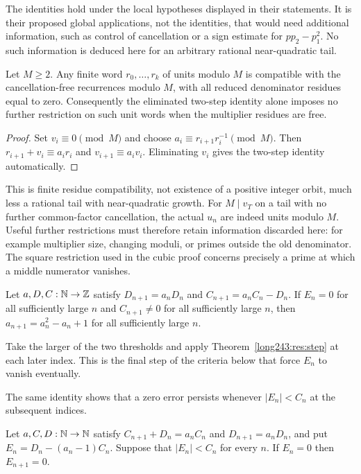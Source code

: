 \documentclass[11pt]{article}
\begin{document}
The identities hold under the local hypotheses displayed in their
statements. It is their proposed global applications, not the identities,
that would need additional information, such as control of cancellation or
a sign estimate for $pp_2-p_1^2$. No such information is deduced here for
an arbitrary rational near-quadratic tail.

\begin{lemma}\label{long243:res:oldmodulussaturation}
Let $M\ge2$. Any finite word $r_0,\ldots,r_k$ of units modulo $M$ is
compatible with the cancellation-free recurrences modulo $M$, with all
reduced denominator residues equal to zero. Consequently the eliminated
two-step identity alone imposes no further restriction on such unit words
when the multiplier residues are free.
\end{lemma}
\begin{proof}
Set $v_i\equiv0\pmod M$ and choose
$a_i\equiv r_{i+1}r_i^{-1}\pmod M$. Then
$r_{i+1}+v_i\equiv a_ir_i$ and $v_{i+1}\equiv a_iv_i$.
Eliminating $v_i$ gives the two-step identity automatically.
\end{proof}
This is finite residue compatibility, not existence of a positive integer
orbit, much less a rational tail with near-quadratic growth.
For $M\mid v_T$ on a tail with no further common-factor cancellation,
the actual $u_n$ are indeed units modulo
$M$. Useful further restrictions must therefore retain information discarded
here: for example multiplier size, changing moduli, or primes outside the
old denominator. The square restriction used in the cubic proof concerns
precisely a prime at which a middle numerator vanishes.

\begin{theorem}\label{long243:res:eventual}
Let $a,D,C:\mathbb{N}\to\mathbb{Z}$ satisfy $D_{n+1}=a_nD_n$ and
$C_{n+1}=a_nC_n-D_n$.  If $E_n=0$ for all sufficiently large $n$ and
$C_{n+1}\ne0$ for all sufficiently large $n$, then $a_{n+1}=a_n^{2}-a_n+1$ for
all sufficiently large $n$.
\end{theorem}

  Take the larger of the two thresholds and apply
Theorem~\ref{long243:res:step} at each later index. This is the final
step of the criteria below that force $E_n$ to vanish eventually.

The same identity shows that a zero error persists whenever
$|E_n|<C_n$ at the subsequent indices.

\begin{theorem}\label{long243:res:absorb}
Let $a,C,D:\mathbb{N}\to\mathbb{N}$ satisfy $C_{n+1}+D_n=a_nC_n$ and
$D_{n+1}=a_nD_n$, and put $E_n=D_n-(a_n-1)C_n$.
Suppose that $|E_n|<C_n$ for every $n$.  If $E_n=0$ then $E_{n+1}=0$.
\end{theorem}
\end{document}

